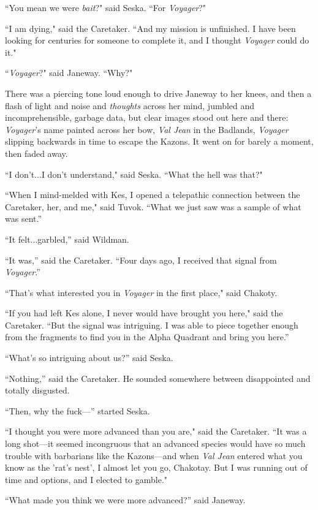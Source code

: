 \documentclass[twoside,letterpaper,12pt]{memoir}
\begin{document}
``You mean we were \textit{bait}?" said Seska. ``For \textit{Voyager}?" 

``I am dying," said the Caretaker. ``And my mission is unfinished. I have been looking for centuries for someone to complete it, and I thought \textit{Voyager} could do it." 

``\textit{Voyager}?" said Janeway. ``Why?" 

There was a piercing tone loud enough to drive Janeway to her knees, and then a flash of light and noise and \textit{thoughts} across her mind, jumbled and incomprehensible, garbage data, but clear images stood out here and there: \textit{Voyager}'s name painted across her bow, \textit{Val Jean} in the Badlands, \textit{Voyager} slipping backwards in time to escape the Kazons. It went on for barely a moment, then faded away. 

``I don't...I don't understand," said Seska. ``What the hell was that?" 

``When I mind-melded with Kes, I opened a telepathic connection between the Caretaker, her, and me," said Tuvok. ``What we just saw was a sample of what was sent.” 

``It felt...garbled,” said Wildman. 

``It was,” said the Caretaker. ``Four days ago, I received that signal from \textit{Voyager}.” 

``That's what interested you in \textit{Voyager} in the first place," said Chakoty. 

``If you had left Kes alone, I never would have brought you here," said the Caretaker. ``But the signal was intriguing. I was able to piece together enough from the fragments to find you in the Alpha Quadrant and bring you here.” 

``What’s so intriguing about us?” said Seska. 

``Nothing,” said the Caretaker. He sounded somewhere between disappointed and totally disgusted. 

``Then, why the fuck---” started Seska. 

``I thought you were more advanced than you are," said the Caretaker. ``It was a long shot---it seemed incongruous that an advanced species would have so much trouble with barbarians like the Kazons---and when \textit{Val Jean} entered what you know as the 'rat's nest', I almost let you go, Chakotay. But I was running out of time and options, and I elected to gamble." 

``What made you think we were more advanced?” said Janeway. 
\end{document}
